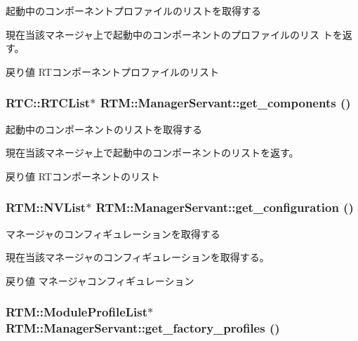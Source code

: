起動中のコンポーネントプロファイルのリストを取得する 

現在当該マネージャ上で起動中のコンポーネントのプロファイルのリス トを返す。

\begin{DoxyReturn}{戻り値}
RTコンポーネントプロファイルのリスト 
\end{DoxyReturn}
\subsubsection[{get\_\-components}]{\setlength{\rightskip}{0pt plus 5cm}RTC::RTCList$\ast$ RTM::ManagerServant::get\_\-components ()}\label{classRTM_1_1ManagerServant_a827ff4bcb8c4c8278dbbe2293700c7be}


起動中のコンポーネントのリストを取得する 

現在当該マネージャ上で起動中のコンポーネントのリストを返す。

\begin{DoxyReturn}{戻り値}
RTコンポーネントのリスト 
\end{DoxyReturn}
\subsubsection[{get\_\-configuration}]{\setlength{\rightskip}{0pt plus 5cm}RTM::NVList$\ast$ RTM::ManagerServant::get\_\-configuration ()}\label{classRTM_1_1ManagerServant_a07ddc50aa1af52666260baf98e98a3f8}


マネージャのコンフィギュレーションを取得する 

現在当該マネージャのコンフィギュレーションを取得する。

\begin{DoxyReturn}{戻り値}
マネージャコンフィギュレーション 
\end{DoxyReturn}
\subsubsection[{get\_\-factory\_\-profiles}]{\setlength{\rightskip}{0pt plus 5cm}RTM::ModuleProfileList$\ast$ RTM::ManagerServant::get\_\-factory\_\-profiles ()}\label{classRTM_1_1ManagerServant_ab6c4c8b57aa03f4bc69a6f7ec30b233d}


